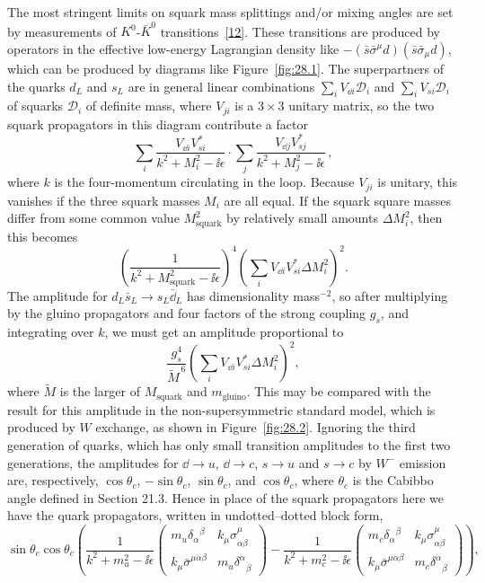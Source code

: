 The most stringent limits on squark mass splittings and/or mixing angles
are set by measurements of \(K^0\)-\(\bar K^0\)
transitions~\hyperref[ch28-ref-12]{[12]}. These transitions are produced
by operators in the effective low-energy Lagrangian density like
\(-(\bar s\bar\sigma^\mu d)(\bar s\bar\sigma_\mu d)\), which can be
produced by diagrams like Figure~\ref{fig:28.1}. The superpartners of the
quarks \(d_L\) and \(s_L\) are in general linear combinations
\(\sum_iV_{\dd i}\mathcal{D}_i\) and \(\sum_iV_{si}\mathcal{D}_i\) of
squarks \(\mathcal{D}_i\) of definite mass, where \(V_{ji}\) is a
\(3\times3\) unitary matrix, so the two squark propagators in
this diagram contribute a factor
\[
  \sum_i\frac{V_{\dd i}V_{si}^*}{k^2+M_i^2-\ii\epsilon}
  \mathbin{\cdot}
  \sum_j\frac{V_{\dd j}V_{sj}^*}{k^2+M_j^2-\ii\epsilon}\,,
\]
where \(k\) is the four-momentum circulating in the loop. Because
\(V_{ji}\) is unitary, this vanishes if the three squark masses \(M_i\)
are all equal. If the squark square masses differ from some common value
\(M_{\mathrm{squark}}^2\) by relatively small amounts \(\Delta M_i^2\),
then this becomes
\[
  \left(
    \frac{1}{k^2+M_{\mathrm{squark}}^2-\ii\epsilon}
  \right)^{\!4}
  \left(
    \sum_iV_{\dd i}V_{si}^*\Delta M_i^2
  \right)^{\!2}.
\]
The amplitude for
\(d_L\bar{s}_L\longrightarrow s_L\bar{\dd}_L\) has dimensionality
mass\(^{-2}\), so after multiplying by the gluino propagators and four
factors of the strong coupling \(g_s\), and integrating over \(k\), we
must get an amplitude proportional to
\begin{equation}
  \frac{g_s^4}{\widetilde{M}^{\,6}}
  \left(
    \sum_iV_{\dd i}V_{si}^*\Delta M_i^2
  \right)^{\!2},
  \tag{28.4.3}\label{eq:28.4.3}
\end{equation}
where \(\widetilde{M}\) is the larger of \(M_{\mathrm{squark}}\) and
\(m_{\mathrm{gluino}}\). This may be compared with the result for this
amplitude in the non-supersymmetric standard model, which is produced by
\(W\) exchange, as shown in Figure~\ref{fig:28.2}. Ignoring the third
generation of quarks, which has only small transition amplitudes to the
first two generations, the amplitudes for \(\dd\longrightarrow u\),
\(\dd\longrightarrow c\), \(s\longrightarrow u\) and
\(s\longrightarrow c\) by \(W^-\) emission are, respectively,
\(\cos\theta_c\), \(-\sin\theta_c\), \(\sin\theta_c\), and
\(\cos\theta_c\), where \(\theta_c\) is the Cabibbo angle defined in
Section 21.3. Hence in place of the squark propagators here we have the
quark propagators, written in undotted--dotted block form,
\[
  \sin\theta_c\cos\theta_c
  \left(
    \frac{1}{k^2+m_u^2-\ii\epsilon}
    \begin{pmatrix}
      m_u\delta_\alpha{}^\beta
        &k_\mu\sigma^\mu_{\alpha\dot\beta}\\
      k_\mu\bar\sigma^{\mu\dot\alpha\beta}
        &m_u\delta^{\dot\alpha}{}_{\dot\beta}
    \end{pmatrix}
    -
    \frac{1}{k^2+m_c^2-\ii\epsilon}
    \begin{pmatrix}
      m_c\delta_\alpha{}^\beta
        &k_\mu\sigma^\mu_{\alpha\dot\beta}\\
      k_\mu\bar\sigma^{\mu\dot\alpha\beta}
        &m_c\delta^{\dot\alpha}{}_{\dot\beta}
    \end{pmatrix}
  \right),
\]
